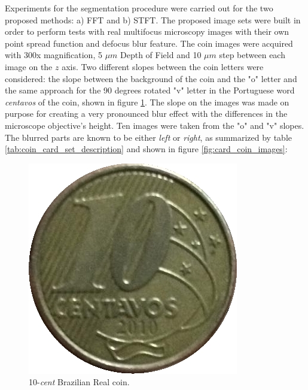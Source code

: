 Experiments for the segmentation procedure were carried out for the two proposed methods: a) FFT and b) STFT. The proposed image sets were built in order to perform tests with real multifocus microscopy images with their own point spread function and defocus blur feature. The coin images were acquired with 300x magnification,  5 $\mu m$ Depth of Field and 10 $\mu m$ step between each image on the $z$ axis. Two different slopes between the coin letters were considered: the slope between the background of the coin and the "o" letter and the same approach for the 90 degrees rotated "v" letter in the Portuguese word \emph{centavos} of the coin, shown in figure \ref{fig:original_coin}. The slope on the images was made on purpose for creating a very pronounced blur effect with the differences in the microscope objective's height. Ten images were taken from the "o" and "v" slopes. The blurred parts are known to be either \emph{left} or \emph{right}, as summarized by table \ref{tab:coin_card_set_description} and shown in figure \ref{fig:card_coin_images}:

\begin{figure}[H]
	\centering
	\caption{\label{fig:original_coin}10-\emph{cent} Brazilian Real coin.}
	\begin{center}
	    \includegraphics[scale=0.5, trim = {0 0 0 1cm}]{images/fig16.png}
	\end{center}
	\centering
    \fautor
\end{figure}

